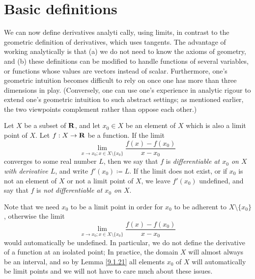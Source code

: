 \section{Basic definitions}\label{sec 10}

\begin{note}
    We can now define derivatives analyti cally, using limits, in contrast to the geometric definition of derivatives, which uses tangents.
    The advantage of working analytically is that
    (a) we do not need to know the axioms of geometry, and
    (b) these definitions can be modified to handle functions of several variables, or functions whose values are vectors instead of scalar.
    Furthermore, one's geometric intuition becomes difficult to rely on once one has more than three dimensions in play.
    (Conversely, one can use one's experience in analytic rigour to extend one's geometric intuition to such abstract settings;
    as mentioned earlier, the two viewpoints complement rather than oppose each other.)
\end{note}

\begin{definition}\label{10.1.1}
    Let \(X\) be a subset of \(\mathbf{R}\), and let \(x_0 \in X\) be an element of \(X\) which is also a limit point of \(X\).
    Let \(f : X \to \mathbf{R}\) be a function.
    If the limit
    \[
        \lim_{x \to x_0 ; x \in X \setminus \{x_0\}} \frac{f(x) - f(x_0)}{x - x_0}
    \]
    converges to some real number \(L\), then we say that \(f\) is \emph{differentiable at \(x_0\) on \(X\) with derivative \(L\)}, and write \(f'(x_0) \coloneqq L\).
    If the limit does not exist, or if \(x_0\) is not an element of \(X\) or not a limit point of \(X\), we leave \(f'(x_0)\) undefined, and say that \(f\) is \emph{not differentiable at \(x_0\) on \(X\)}.
\end{definition}

\begin{remark}\label{10.1.2}
    Note that we need \(x_0\) to be a limit point in order for \(x_0\) to be adherent to \(X \setminus \{x_0\}\), otherwise the limit
    \[
        \lim_{x \to x_0 ; x \in X \setminus \{x_0\}} \frac{f(x) - f(x_0)}{x - x_0}
    \]
    would automatically be undefined.
    In particular, we do not define the derivative of a function at an isolated point;
    In practice, the domain \(X\) will almost always be an interval, and so by Lemma \ref{9.1.21} all elements \(x_0\) of \(X\) will automatically be limit points and we will not have to care much about these issues.
\end{remark}

